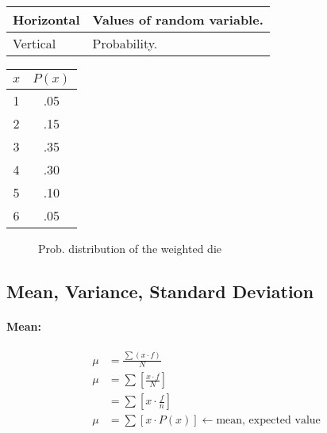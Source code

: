 \begin{table}[htbp]
    \centering
    \begin{tabular}{l|l}
        \toprule
        Horizontal & Values of random variable. \\
        \midrule
        Vertical & Probability. \\
        \bottomrule
    \end{tabular}
\end{table}

\begin{table}[htbp]
    \centering
    \begin{tabular}{c|c}
        \toprule
        $x$ & $P(x)$ \\
        \midrule
        1 & .05 \\
        \midrule
        2 & .15 \\
        \midrule
        3 & .35 \\
        \midrule
        4 & .30 \\
        \midrule
        5 & .10 \\
        \midrule
        6 & .05 \\
        \bottomrule
    \end{tabular}
\end{table}


\begin{figure}[ht]
    \centering
    \caption{Prob. distribution of the weighted die}
    \label{fig:stats-8}
\end{figure}


\subsection{Mean, Variance, Standard Deviation}
\paragraph{Mean:}
\begin{align*}
    \mu&=\frac{\sum (x \cdot f)}{N}\\
\mu &= \sum \left[ \frac{x\cdot f}{N} \right] \\
&=\sum \left[ x\cdot \frac{f}{n} \right] \\
    \mu &= \sum \left[ x\cdot P(x) \right] \leftarrow \text{mean, expected value}\\
\end{align*}

